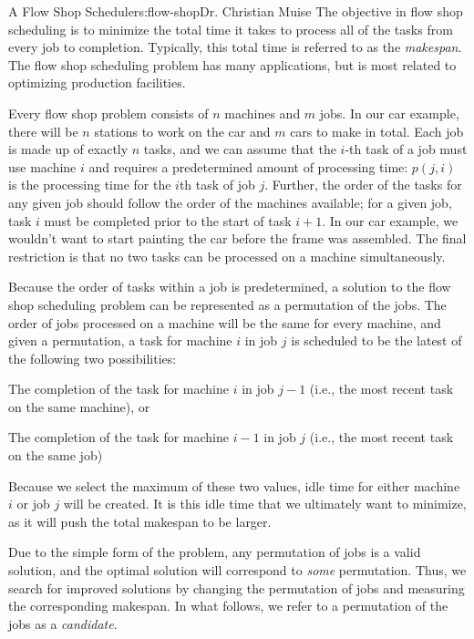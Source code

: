 \begin{aosachapter}{A Flow Shop Scheduler}{s:flow-shop}{Dr. Christian Muise}
The objective in flow shop scheduling is to minimize the total time it
takes to process all of the tasks from every job to completion.
Typically, this total time is referred to as the \emph{makespan}. The
flow shop scheduling problem has many applications, but is most related
to optimizing production facilities.

Every flow shop problem consists of $n$ machines and $m$ jobs. In our
car example, there will be $n$ stations to work on the car and $m$ cars
to make in total. Each job is made up of exactly $n$ tasks, and we can
assume that the $i$-th task of a job must use machine $i$ and requires a
predetermined amount of processing time: $p(j,i)$ is the processing time
for the $i$th task of job $j$. Further, the order of the tasks for any
given job should follow the order of the machines available; for a given
job, task $i$ must be completed prior to the start of task $i+1$. In our
car example, we wouldn't want to start painting the car before the frame
was assembled. The final restriction is that no two tasks can be
processed on a machine simultaneously.

Because the order of tasks within a job is predetermined, a solution to
the flow shop scheduling problem can be represented as a permutation of
the jobs. The order of jobs processed on a machine will be the same for
every machine, and given a permutation, a task for machine $i$ in job
$j$ is scheduled to be the latest of the following two possibilities:

\begin{aosaenumerate}
\def\labelenumi{\arabic{enumi}.}
\item
  The completion of the task for machine $i$ in job $j-1$ (i.e., the
  most recent task on the same machine), or
\item
  The completion of the task for machine $i-1$ in job $j$ (i.e., the
  most recent task on the same job)
\end{aosaenumerate}

Because we select the maximum of these two values, idle time for either
machine $i$ or job $j$ will be created. It is this idle time that we
ultimately want to minimize, as it will push the total makespan to be
larger.

Due to the simple form of the problem, any permutation of jobs is a
valid solution, and the optimal solution will correspond to \emph{some}
permutation. Thus, we search for improved solutions by changing the
permutation of jobs and measuring the corresponding makespan. In what
follows, we refer to a permutation of the jobs as a \emph{candidate}.


\end{aosachapter}
